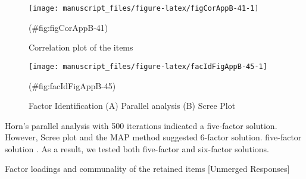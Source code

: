 \begin{appendix}
\begin{figure}

{\centering \texttt{[image: manuscript\_files/figure-latex/figCorAppB-41-1]} 

}

\caption{Correlation plot of the items}(\#fig:figCorAppB-41)
\end{figure}

\begin{figure}

{\centering \texttt{[image: manuscript\_files/figure-latex/facIdFigAppB-45-1]} 

}

\caption{Factor Identification (A) Parallel analysis (B) Scree Plot}(\#fig:facIdFigAppB-45)
\end{figure}

Horn's parallel analysis with 500 iterations indicated a five-factor
solution. However, Scree plot and the MAP method suggested 6-factor
solution. five-factor solution . As a result, we tested both five-factor
and six-factor solutions.

\begin{table}[h]

\begin{center}
\begin{threeparttable}

\caption{\label{tab:EFATableAppB-48}Factor loadings and communality of the retained items [Unmerged Responses]}

\small{

}
\end{threeparttable}
\end{center}
\end{table}
\end{appendix}
